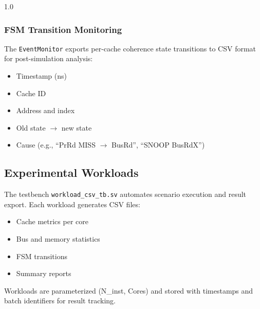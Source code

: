 \documentclass[12pt]{article}
\begin{document}
\begin{spacing}{1.0}
\subsubsection{FSM Transition Monitoring}

The \texttt{EventMonitor} exports per-cache coherence state transitions to CSV format for post-simulation analysis:

\begin{itemize}
    \item Timestamp (ns)
    \item Cache ID
    \item Address and index
    \item Old state $\to$ new state
    \item Cause (e.g., ``PrRd MISS $\to$ BusRd'', ``SNOOP BusRdX'')
\end{itemize}

\subsection{Experimental Workloads}

The testbench \texttt{workload\_csv\_tb.sv} automates scenario execution and result export. Each workload generates CSV files:

\begin{itemize}
    \item Cache metrics per core
    \item Bus and memory statistics
    \item FSM transitions
    \item Summary reports
\end{itemize}

Workloads are parameterized (N\_inst, Cores) and stored with timestamps and batch identifiers for result tracking.

\end{spacing}
\printbibliography
\end{document}
